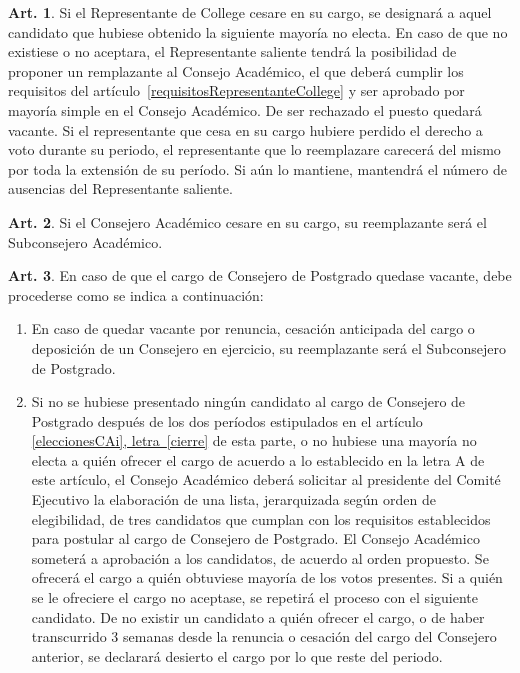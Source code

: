 \documentclass[letterpaper,11pt]{article}
\theoremstyle{definition}%
\newtheorem{art}{Art.} %
\newcommand{\aaref}[2]{\hyperref[#2]{\ref*{#1}, letra~\ref*{#2}}}
\begin{document}
\begin{art}
	Si el Representante de College cesare en su cargo, se designará a aquel candidato que hubiese obtenido la siguiente mayoría no electa. En caso de que no existiese o no aceptara, el Representante saliente tendrá la posibilidad de proponer un remplazante al Consejo Académico, el que deberá cumplir los requisitos del artículo~\ref{requisitosRepresentanteCollege} y ser aprobado por mayoría simple en el Consejo Académico. De ser rechazado el puesto quedará vacante. Si el representante que cesa en su cargo hubiere perdido el derecho a voto durante su periodo, el representante que lo reemplazare carecerá del mismo por toda la extensión de su período. Si aún lo mantiene, mantendrá el número de ausencias del Representante saliente.
\end{art}

\begin{art}\label{reemplazoCA}
	Si el Consejero Académico cesare en su cargo, su reemplazante será el Subconsejero Académico.
\end{art}

\begin{art} \label{eleccionExtraordinariaCAPostgrado}
	En caso de que el cargo de Consejero de Postgrado quedase vacante, debe procederse como se indica a continuación:
	\begin{enumerate}
		\item\label{cp_renuncia} En caso de quedar vacante por renuncia, cesación anticipada del cargo o deposición de un Consejero en ejercicio, su reemplazante será el Subconsejero de Postgrado.

		\item Si no se hubiese presentado ningún candidato al cargo de Consejero de Postgrado después de los dos períodos estipulados en el artículo \aaref{eleccionesCAi}{cierre} de esta parte, o no hubiese una mayoría no electa a quién ofrecer el cargo de acuerdo a lo establecido en la letra A de este artículo, el Consejo Académico deberá solicitar al presidente del Comité Ejecutivo la elaboración de una lista, jerarquizada según orden de elegibilidad, de tres candidatos que cumplan con los requisitos establecidos para postular al cargo de Consejero de Postgrado. El Consejo Académico someterá a aprobación a los candidatos, de acuerdo al orden propuesto. Se ofrecerá el cargo a quién obtuviese mayoría de los votos presentes. Si a quién se le ofreciere el cargo no aceptase, se repetirá el proceso con el siguiente candidato. De no existir un candidato a quién ofrecer el cargo, o de haber transcurrido 3 semanas desde la renuncia o cesación del cargo del Consejero anterior, se declarará desierto el cargo por lo que reste del periodo.
	\end{enumerate}
\end{art}
\end{document}
